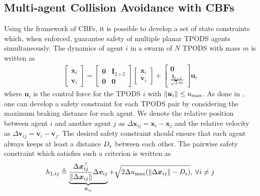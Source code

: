 \subsection{Multi-agent Collision Avoidance with CBFs}
%
%
Using the framework of CBFs, it is possible to develop a set of state constraints which, when enforced, guarantee safety of multiple planar TPODS agents simultaneously. The dynamics of agent $i$ in a swarm of $N$ TPODS with mass $m$ is written as 
\begin{align}
    \begin{bmatrix}
        \dot{\boldsymbol{x}}_i \\
        \dot{\boldsymbol{v}}_i
    \end{bmatrix}
    =
    \begin{bmatrix}
        \boldsymbol{0} & \boldsymbol{I}_{2\times2} \\
        \boldsymbol{0} & \boldsymbol{0}
    \end{bmatrix}
    \begin{bmatrix}
        {\boldsymbol{x}}_i \\
        {\boldsymbol{v}}_i
    \end{bmatrix}
    + 
    \begin{bmatrix}
        \boldsymbol{0} \\
        \frac{\boldsymbol{I}_{2\times2}}{\sqrt{2}m}
    \end{bmatrix} \boldsymbol{u}_i
\end{align}
where $\boldsymbol{u}_i$ is the control force for the TPODS $i$ with $\norm{\boldsymbol{u}_i} \leq u_{\rm max}$. As done in \cite{BORRMANN201568}, one can develop a safety constraint for each TPODS pair by considering the maximum braking distance for each agent. We denote the relative position between agent $i$ and another agent $j$ as $\Delta \boldsymbol{x}_{ij} = \boldsymbol{x}_i - \boldsymbol{x}_j$ and the relative velocity as $\Delta \boldsymbol{v}_{ij} = \boldsymbol{v}_i - \boldsymbol{v}_j$. The desired safety constraint should ensure that each agent always keeps at least a distance $D_{\rm s}$ between each other. The pairwise safety constraint which satisfies such a criterion is written as
\begin{align}
    h_{1,ij} \triangleq \underbrace{\frac{\Delta \boldsymbol{x}_{ij}^{\top}}{\norm{\Delta \boldsymbol{x}_{ij}}}\Delta \boldsymbol{v}_{ij}}_{\Bar{\boldsymbol{v}}_{ij}} + \sqrt{2\Delta u_{\rm max}(\norm{\Delta \boldsymbol{x}_{ij}} - D_{\rm s})}, \nspace{4} \forall \nspace{1} i \neq j
\end{align}
